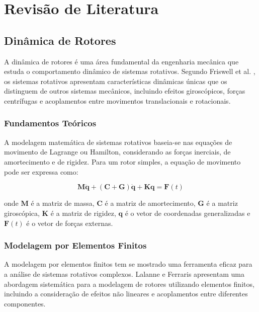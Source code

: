 
\chapter{Revisão de Literatura}

\section{Dinâmica de Rotores}

A dinâmica de rotores é uma área fundamental da engenharia mecânica que estuda o comportamento dinâmico de sistemas rotativos. Segundo Friswell et al. \cite{friswell2010}, os sistemas rotativos apresentam características dinâmicas únicas que os distinguem de outros sistemas mecânicos, incluindo efeitos giroscópicos, forças centrífugas e acoplamentos entre movimentos translacionais e rotacionais.

\subsection{Fundamentos Teóricos}

A modelagem matemática de sistemas rotativos baseia-se nas equações de movimento de Lagrange ou Hamilton, considerando as forças inerciais, de amortecimento e de rigidez. Para um rotor simples, a equação de movimento pode ser expressa como:

\begin{equation}
\mathbf{M}\ddot{\mathbf{q}} + (\mathbf{C} + \mathbf{G})\dot{\mathbf{q}} + \mathbf{K}\mathbf{q} = \mathbf{F}(t)
\end{equation}

onde $\mathbf{M}$ é a matriz de massa, $\mathbf{C}$ é a matriz de amortecimento, $\mathbf{G}$ é a matriz giroscópica, $\mathbf{K}$ é a matriz de rigidez, $\mathbf{q}$ é o vetor de coordenadas generalizadas e $\mathbf{F}(t)$ é o vetor de forças externas.

\subsection{Modelagem por Elementos Finitos}

A modelagem por elementos finitos tem se mostrado uma ferramenta eficaz para a análise de sistemas rotativos complexos. Lalanne e Ferraris \cite{lalanne1998} apresentam uma abordagem sistemática para a modelagem de rotores utilizando elementos finitos, incluindo a consideração de efeitos não lineares e acoplamentos entre diferentes componentes.

